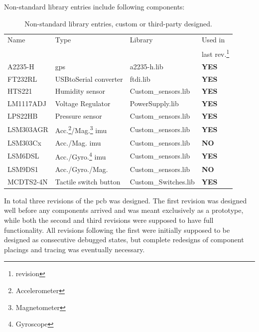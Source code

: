 Non-standard library entries include following components:\\
\begin{minipage}{\linewidth}
\begin{table}[H]
\centering
	\begin{tabular}{ l | l | l | l }
 	Name		& Type 								& Library 				& Used in         \\
 			&									&					& last rev.\footnote{revision}\\
	\hline
  	A2235-H  	& \gls{gps} 								& a2235-h.lib 			& \textbf{YES}\\
  	FT232RL 	& USBtoSerial converter 						& ftdi.lib\cite{ftdi}			& \textbf{YES}\\
  	HTS221 	& Humidity sensor 							& Custom\_sensors.lib 		& \textbf{YES}\\
  	LM1117ADJ 	& Voltage Regulator						& PowerSupply.lib\cite{lm1117} 	& \textbf{YES}\\
  	LPS22HB 	& Pressure sensor  							& Custom\_sensors.lib 		& \textbf{YES}\\
  	LSM303AGR	& Acc.\footnote{Accelerometer}/Mag.\footnote{Magnetometer} \gls{imu} & Custom\_sensors.lib & \textbf{YES}\\
  	LSM303Cx 	& Acc./Mag. \gls{imu} 						& Custom\_sensors.lib		& \textbf{NO} \\
  	LSM6DSL 	& Acc./Gyro.\footnote{Gyroscope} \gls{imu} 			& Custom\_sensors.lib 		& \textbf{YES}\\
  	LSM9DS1 	& Acc./Gyro./Mag. 							& Custom\_sensors.lib 		& \textbf{NO} \\
  	MCDTS2-4N 	& Tactile switch button 						& Custom\_Switches.lib 		& \textbf{YES}\\
\end{tabular}
\caption{Non-standard library entries, custom or third-party designed.}
\label{table:nstdlibs}
\end{table}
\end{minipage}
\vspace{.5cm}

In total three revisions of the \gls{pcb} was designed. The first revision was designed well before any components arrived and was meant exclusively as a prototype, while both the second and third revisions were supposed to have full functionality. All revisions following the first were initially supposed to be designed as consecutive debugged states, but complete redesigns of component placings and tracing was eventually necessary.

